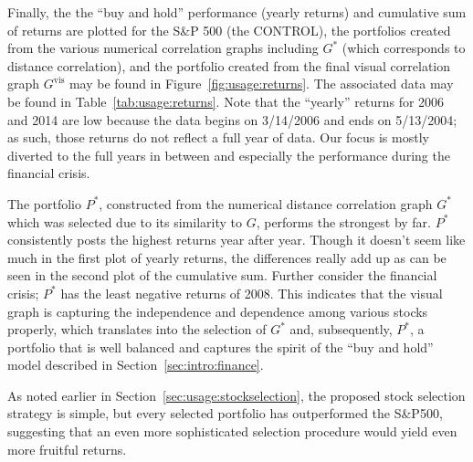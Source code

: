 Finally, the the ``buy and hold'' performance (yearly returns) and cumulative 
sum of returns are plotted for the S\&P 500 (the CONTROL), 
the portfolios created from the various numerical correlation graphs 
including  $G^*$ (which corresponds to distance correlation), 
and the portfolio created from the final visual correlation graph 
$G^{\text{vis}}$ may be found in Figure~\ref{fig:usage:returns}. The associated 
data may be found in Table~\ref{tab:usage:returns}. Note 
that the ``yearly'' returns for 2006 and 2014 are low because the data begins 
on 3/14/2006 and ends on 5/13/2004; as such, those returns do not reflect a 
full year of data. Our focus is mostly diverted to the full years in between 
and especially the performance during the financial crisis. 

The portfolio $P^*$, constructed from the numerical distance correlation graph 
$G^*$ which was selected due to its similarity to $G$, performs the strongest 
by far. $P^*$ consistently posts the highest returns year after year. Though it 
doesn't seem like much in the first plot of yearly returns, the differences 
really add up as can be seen in the second plot of the cumulative sum. Further 
consider the financial crisis; $P^*$ has the least negative returns of 2008. 
This indicates that the visual graph is capturing the independence and 
dependence among various stocks properly, which translates into the selection 
of $G^*$ and, subsequently, $P^*$, a portfolio that is well balanced and 
captures the spirit of the ``buy and hold'' model described in 
Section~\ref{sec:intro:finance}.


As noted earlier in Section~\ref{sec:usage:stockselection}, the proposed stock 
selection strategy is simple, but every selected portfolio has outperformed the 
S\&P500, suggesting that an even more sophisticated selection procedure would 
yield even more fruitful returns.


